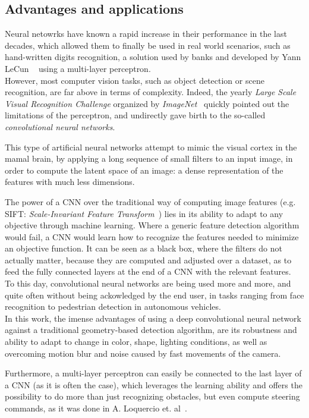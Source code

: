 \subsection{Advantages and applications}

Neural netowrks have known a rapid increase in their performance in the last
decades, which allowed them to finally be used in real world scenarios, such as
hand-written digits recognition, a solution used by banks and developed by Yann
LeCun \etal~\cite{41400} using a multi-layer perceptron.\\

However, most computer vision tasks, such as object detection or scene
recognition, are far above in terms of complexity. Indeed, the yearly
\emph{Large Scale Visual Recognition Challenge} organized by
\emph{ImageNet}~\cite{ILSVRC} quickly pointed out the limitations of the
perceptron, and undirectly gave birth to the so-called \emph{convolutional
neural networks}.

This type of artificial neural networks attempt to mimic the visual cortex in
the mamal brain, by applying a long sequence of small filters to an input
image, in order to compute the latent space of an image: a dense representation
of the features with much less dimensions.

The power of a CNN over the traditional way of computing image features (e.g.
SIFT: \emph{Scale-Invariant Feature Transform}~\cite{SIFT}) lies in its ability
to adapt to any objective through machine learning. Where a generic feature
detection algorithm would fail, a CNN would learn how to recognize the features
needed to minimize an objective function. It can be seen as a black box, where
the filters do not actually matter, because they are computed and adjusted over
a dataset, as to feed the fully connected layers at the end of a CNN with the
relevant features.\\

To this day, convolutional neural networks are being used more and more, and
quite often without being ackowledged by the end user, in tasks ranging from
face recognition to pedestrian detection in autonomous vehicles.\\

In this work, the imense advantages of using a deep convolutional neural network
against a traditional geometry-based detection algorithm, are its robustness and
ability to adapt to change in color, shape, lighting conditions, as well as
overcoming motion blur and noise caused by fast movements of the camera.

Furthermore, a multi-layer perceptron can easily be connected to the last layer
of a CNN (as it is often the case), which leverages the learning ability and
offers the possibility to do more than just recognizing obstacles, but even
compute steering commands, as it was done in A. Loquercio et. al~\cite{dronet}.
